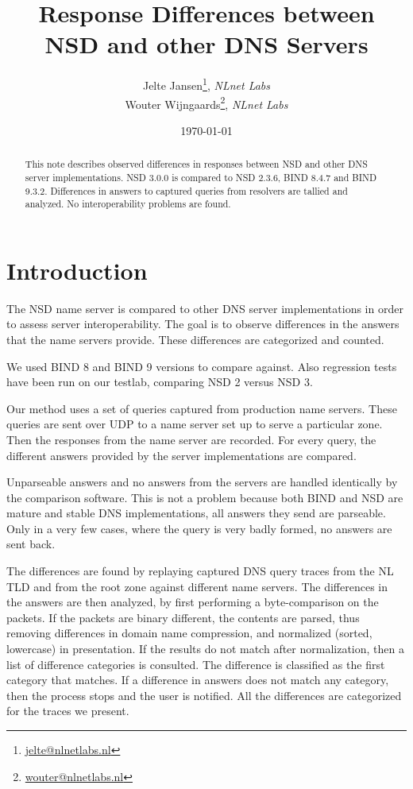 \documentclass[twoside,titlepage,english]{nlnetlabs}
\title{Response Differences between\\ NSD and other DNS Servers}
\author{
	\texorpdfstring{
		Jelte Jansen\thanks{\href{mailto:jelte@nlnetlabs.nl}{jelte@nlnetlabs.nl}},
		\textsl{NLnet Labs}\\
		Wouter Wijngaards\thanks{\href{mailto:wouter@nlnetlabs.nl}{wouter@nlnetlabs.nl}},
		\textsl{NLnet Labs}
	}
	{Jelte Jansen, Wouter C.A. Wijngaards}
}
\date{
	\today
}
\begin{document}
\flushbottom
\maketitle{}

\begin{abstract}
This note describes observed differences in responses between NSD and
other DNS server implementations. NSD 3.0.0 is compared to NSD 2.3.6,
BIND 8.4.7 and BIND 9.3.2. Differences in answers to captured queries from 
resolvers are tallied and analyzed. No interoperability problems are found.
\end{abstract}


\tableofcontents
\newpage

\section{Introduction}

The NSD name server is compared to other DNS server implementations
in order to assess server interoperability.
The goal is to observe differences in the answers that the name servers
provide. These differences are categorized and counted. 

We used BIND 8 and BIND 9 versions to compare against. Also regression
tests have been run on our testlab, comparing NSD 2 versus NSD 3.

Our method uses a set of queries captured from production name servers. 
These queries are sent over UDP to a name server set up to serve a 
particular zone. Then the responses from the name server are recorded. 
For every query, the different answers provided by the server 
implementations are compared.

Unparseable answers and no answers from the servers are handled 
identically by the comparison software. This is not a problem because 
both BIND and NSD are mature and stable DNS implementations, all answers 
they send are parseable. Only in a very few cases, where the query is 
very badly formed, no answers are sent back.

The differences are found by replaying captured DNS query traces from 
the NL TLD and from the root zone against different name servers. The 
differences in the answers are then analyzed, by first performing a
byte-comparison on the packets. If the packets are binary different, 
the contents are parsed, thus removing differences in domain name 
compression, and normalized (sorted, lowercase) in presentation. If the
results do not match after normalization, then a list of difference 
categories is consulted. The difference is classified as the first
category that matches. If a difference in answers does not match any 
category, then the process stops and the user is notified. All the
differences are categorized for the traces we present.
\end{document}

